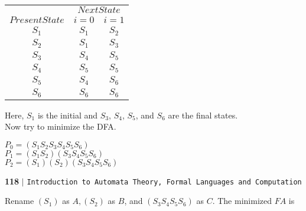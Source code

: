 \documentclass{article}
\begin{document}
\begin{center}
\begin{tabular}{ccc}
 \hline

 \hline

 \hline

 \hline
 & \multicolumn{2}{c}{$Next State$}\\
 \cline{2-3}
 $Present State$ &  $i=0$ & $i=1$\\
\hline
 $S_1$   &   $S_1$      &  $S_2$ \\
 $S_2$   &   $S_1$      &  $S_3$   \\
 $S_3$   &   $S_4$      &  $S_5$   \\
 $S_4$   &   $S_5$      &  $S_5$   \\
 $S_5$   &   $S_4$      &  $S_6$  \\
 $S_6$   &   $S_6$      &  $S_6$  \\
 \hline

 \hline

 \hline

 \hline
\end{tabular}
\end{center}


Here, $S_1$ is the initial and $S_3$, $S_4$, $S_5$, and $S_6$ are the final states.\\
 \hspace*{0.5cm} Now try to minimize the DFA.
 \begin{center}
   $P_0 = (S_1 S_2 S_3 S_4 S_5 S_6)$\\
   $P_1 = (S_1 S_2)(S_3 S_4 S_5 S_6)$\\
   $P_2 = (S_1) (S_2) (S_3 S_4 S_5 S_6)$\\
 \end{center}
 
 \begin{flushleft}
    \textbf{118}\hspace*{0.1cm} \textbf{$|$} \hspace*{0.1cm} \texttt{Introduction to Automata Theory, Formal Languages and Computation}
  \end{flushleft}
  \vspace*{0.5cm}

  Rename $(S_1)$ as $A, (S_2)$ as $B$, and $(S_3 S_4 S_5 S_6)$ as $C$. The minimized $FA$ is\\
\end{document}
